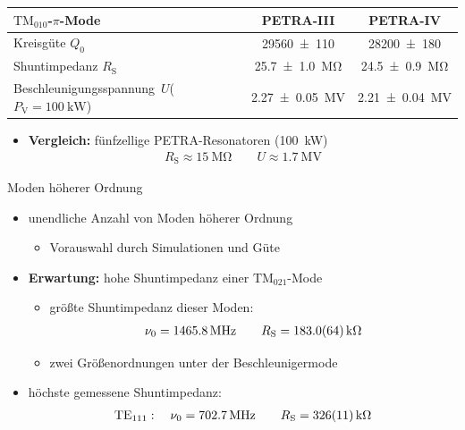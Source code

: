 \documentclass[12pt,xcolor=dvipsnames,professionalfonts]{beamer}
\begin{document}
\begin{frame}
	\centering
	{\def\arraystretch{2}\tabcolsep=10pt
	\begin{tabular}{p{3.5cm}|cc} \toprule
		$\mathrm{TM}_{010}$-$\pi$-Mode & \textbf{PETRA-III} & \textbf{PETRA-IV} \\ \midrule
		Kreisgüte $Q_0$ & \num{29560 +- 110} & \num{28200 +- 180} \\
		Shuntimpedanz $R_\mathrm{S}$ & \SI{25.7 +- 1.0}{\mega\ohm} & \SI{24.5 +- 0.9}{\mega\ohm} \\
		Beschleunigungs\-spannung~$U$\newline($P_\mathrm{V} = \SI{100}{\kilo\watt}$)& \SI{2.27 +- 0.05}{\mega\volt} & \SI{2.21 +- 0.04}{\mega\volt} \\
	\end{tabular}
	}
	\vspace*{0.5cm}
	\begin{itemize}
		\item \textbf{Vergleich:} fünfzellige PETRA-Resonatoren (\SI{100}{kW}) \cite{desy_petra5}
		\begin{align*}
			R_\mathrm{S} \approx \SI{15}{\mega\ohm} \qquad U \approx \SI{1.7}{\mega\volt}
		\end{align*}
	\end{itemize}
\end{frame}

\begin{frame}{Moden höherer Ordnung}
	\begin{itemize}
		\setlength\itemsep{1.25em}
		\item unendliche Anzahl von Moden höherer Ordnung
		\begin{itemize}
			\item Vorauswahl durch Simulationen \cite{schedler} und Güte
		\end{itemize}
		
		\item \textbf{Erwartung:} hohe Shuntimpedanz einer $\mathrm{TM}_{021}$-Mode
		\begin{itemize}
			\item größte Shuntimpedanz dieser Moden:
			\begin{align*}
			\nu_0 = \SI{1465.8}{\mega\hertz}\qquad R_\mathrm{S} = \SI{183.0 +- 6.4}{\kilo\ohm}
			\end{align*}
			\item zwei Größenordnungen unter der Beschleunigermode
		\end{itemize}
		
		\item höchste gemessene Shuntimpedanz:
		\begin{align*}
			\mathrm{TE}_{111}: \quad \nu_0 = \SI{702.7}{\mega\hertz} \qquad R_\mathrm{S} = \SI{326 +- 11}{\kilo\ohm}
		\end{align*}
	\end{itemize}
\end{frame}
\end{document}
